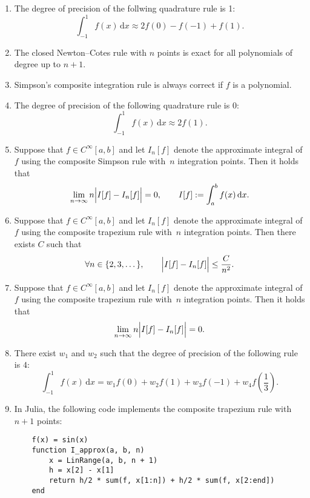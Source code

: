 \documentclass{article}
\renewcommand{\d}{\mathrm d}
\begin{document}
\begin{enumerate}

    \item
        The degree of precision of the follwing quadrature rule is 1:
        \[
            \int_{-1}^{1} f(x) \, \d x
            \approx 2 f(0) - f(-1) + f(1).
        \]

    \item
        The closed Newton--Cotes rule with $n$ points is exact for all polynomials of degree up to $n+1$.

    \item
        Simpson's composite integration rule is always correct if $f$ is a polynomial.

    \item
        The degree of precision of the following quadrature rule is 0:
        \[
            \int_{-1}^1 f(x) \, \d x \approx 2f(1).
        \]

    \item
        Suppose that $f \in C^{\infty}[a, b]$ and let $I_n[f]$ denote the approximate integral of $f$ using the composite Simpson rule
        with~$n$ integration points.
        Then it holds that
        \[
            \lim_{n \to \infty} n \Bigl\lvert I[f] - I_n[f] \Bigr\rvert = 0, \qquad I[f] := \int_{a}^{b} f(x) \, \d x.
        \]

    \item
        Suppose that $f \in C^{\infty}[a, b]$ and let $I_n[f]$ denote the approximate integral of $f$ using the composite trapezium rule
        with~$n$ integration points.
        Then there exists $C$ such that
        \[
             \forall n \in \{2, 3, \dotsc \}, \qquad
             \Bigl\lvert I[f] - I_n[f] \Bigr\rvert \leq \frac{C}{n^2}.
        \]

    \item
        Suppose that $f \in C^{\infty}[a, b]$ and let $I_n[f]$ denote the approximate integral of $f$ using the composite trapezium rule
        with~$n$ integration points.
        Then it holds that
        \[
             \lim_{n \to \infty} n \Bigl\lvert I[f] - I_n[f] \Bigr\rvert = 0.
        \]

    \item
        There exist $w_1$ and $w_2$ such that the degree of precision of the following rule is $4$:
        \[
            \int_{-1}^1 f(x) \, \d x
            = w_1 f(0) + w_2 f(1) + w_3 f(-1) + w_4 f \left( \frac{1}{3} \right).
        \]

    \item
        In Julia, the following code implements the composite trapezium rule with $n+1$ points:
        \begin{verbatim}
    f(x) = sin(x)
    function I_approx(a, b, n)
        x = LinRange(a, b, n + 1)
        h = x[2] - x[1]
        return h/2 * sum(f, x[1:n]) + h/2 * sum(f, x[2:end])
    end
        \end{verbatim}


\end{enumerate}
\end{document}
